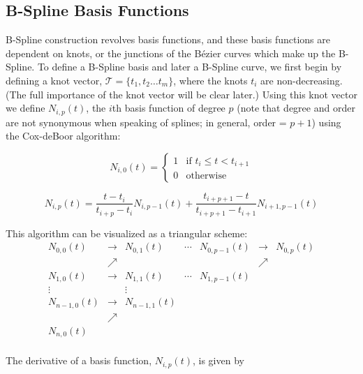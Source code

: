 \subsection{B-Spline Basis Functions}
B-Spline construction revolves basis functions, and these basis functions are dependent on knots, or the junctions of the Bézier curves which make up the B-Spline. To define a B-Spline basis and later a B-Spline curve, we first begin by defining a knot vector, $\mathcal{T} = \{t_1, t_2  \ldots t_{m}\}$, where the knots $t_i$ are non-decreasing.  (The full importance of the knot vector will be clear later.) Using this knot vector we define $N_{i,p}(t)$, the $i$th basis function of degree $p$ (note that degree and order are not synonymous when speaking of splines; in general, order = $p+1$) using the Cox-deBoor algorithm:

\begin{equation} 
\label{eqn:basis0}
N_{i,0}(t) = 
\begin{cases} 
1 & \text{if  } t_i \leq t < t_{i+1} \\
0 & \text{otherwise}
\end{cases} 
\end{equation}

\begin{equation}
\label{eqn:basisgeneral} 
N_{i,p}(t) = \frac{t-t_i}{t_{i+p}-t_i} N_{i,p-1}(t) + \frac{t_{i+p+1}-t}{t_{i+p+1}-t_{i+1}}N_{i+1,p-1}(t) \end{equation}

\bigskip

This algorithm can be visualized as a triangular scheme:
\begin{equation}
\begin{matrix}
	N_{0,0}(t) & \rightarrow & N_{0,1}(t) & \cdots & N_{0,p-1}(t) & \rightarrow & N_{0,p}(t)\\ 
	& \nearrow &  &  &  & \nearrow & \\ 
	N_{1,0}(t) & \rightarrow & N_{1,1}(t) & \cdots & N_{1,p-1}(t) &  & \\ 
	\vdots &  & \vdots &  &  &  & \\ 
	N_{n-1,0}(t) & \rightarrow & N_{n-1,1}(t) &  &  &  & \\ 
	& \nearrow &  &  &  &  & \\ 
	N_{n,0}(t) &  &  &  &  &  & \\ 
\end{matrix}
\end{equation}

The derivative of a basis function, $N_{i,p}(t)$, is given by

